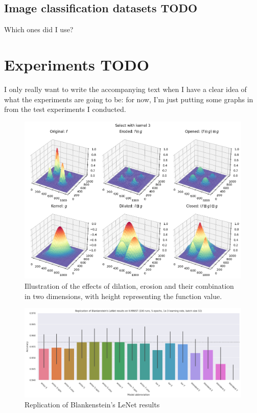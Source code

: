 \documentclass[a4paper, 12pt]{report}
\def\comment#1{\color{red}#1\color{black}}
\begin{document}
\newpage
\section{Image classification datasets \comment{TODO}}
\comment{Which ones did I use?}


\chapter{Experiments \comment{TODO}}
\comment{I only really want to write the accompanying text when I have a clear idea of what the experiments are going to be: for now, I'm just putting some graphs in from the test experiments I conducted.}
\begin{figure}[h!]
	\center
  \includegraphics[width=\textwidth]{figures/morphological_3d.png}
  \caption{Illustration of the effects of dilation, erosion and their combination in two dimensions, with height representing the function value.}
  \label{fig:res1}
\end{figure}
\begin{figure}[h!]
	\center
  \includegraphics[width=\textwidth]{figures/thierry_replication.png}
  \caption{Replication of Blankenstein's LeNet results \cite{thierrybsc} }
  \label{fig:res2}
\end{figure}
\end{document}
